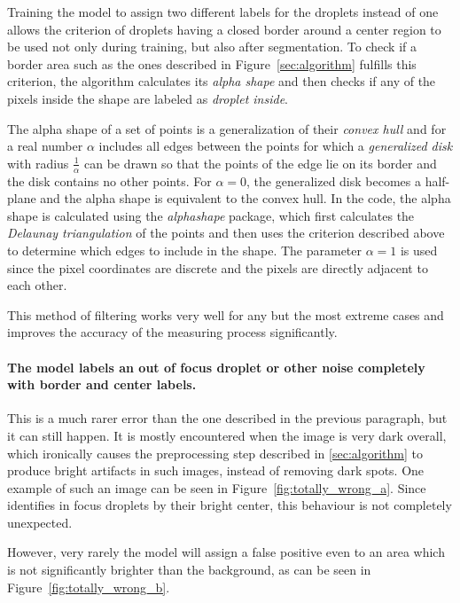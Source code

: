 Training the model to assign two different labels for the droplets instead of one allows the criterion of droplets having a closed border around a center region to be used not only during training, but also after segmentation.
To check if a border area such as the ones described in Figure~\ref{sec:algorithm} fulfills this criterion, the algorithm calculates its \emph{alpha shape}\cite{edelsbrunnerShapeSetPoints1983a} and then checks if any of the pixels inside the shape are labeled as \emph{droplet inside}.

The alpha shape of a set of points is a generalization of their \emph{convex hull} and for a real number $\alpha$ includes all edges between the points for which a \emph{generalized disk} with radius $\frac{1}{\alpha}$ can be drawn so that the points of the edge lie on its border and the disk contains no other points. For $\alpha=0$, the generalized disk becomes a half-plane and the alpha shape is equivalent to the convex hull. In the code, the alpha shape is calculated using the \emph{alphashape}\cite{bellockBellockkAlphashapeV12021} package, which first calculates the \emph{Delaunay triangulation} of the points and then uses the criterion described above to determine which edges to include in the shape. The parameter $\alpha = 1$ is used since the pixel coordinates are discrete and the pixels are directly adjacent to each other. 

This method of filtering works very well for any but the most extreme cases and improves the accuracy of the measuring process significantly.

\paragraph{The model labels an out of focus droplet or other noise completely with border and center labels.}

This is a much rarer error than the one described in the previous paragraph, but it can still happen. 
It is mostly encountered when the image is very dark overall, which ironically causes the preprocessing step described in \ref{sec:algorithm} to produce bright artifacts in such images, instead of removing dark spots. 
One example of such an image can be seen in Figure~\ref{fig:totally_wrong_a}.
Since identifies in focus droplets by their bright center, this behaviour is not completely unexpected.

However, very rarely the model will assign a false positive even to an area which is not significantly brighter than the background, as can be seen in Figure~\ref{fig:totally_wrong_b}.

